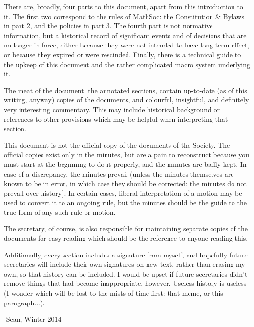 There are, broadly, four parts to this document, apart from this
introduction to it. The first two correspond to the rules of MathSoc:
the Constitution \& Bylaws in part 2, and the policies in part 3. The fourth
part is not normative information, but a historical record of significant events
and of decisions that are no longer in force, either because they were not
intended to have long-term effect, or because they expired or were rescinded.
Finally, there is a technical guide to the upkeep of this document and the
rather complicated macro system underlying it.

The meat of the document, the annotated sections, contain up-to-date (as of this
writing, anyway) copies of the documents, and colourful, insightful, and
definitely very interesting commentary. This may include historical background
or references to other provisions which may be helpful when interpreting that
section.

This document is not the official copy of the documents of the Society. The
official copies exist only in the minutes, but are a pain to reconstruct because
you must start at the beginning to do it properly, and the minutes are badly
kept. In case of a discrepancy, the minutes prevail (unless the minutes
themselves are known to be in error, in which case they should be corrected; the
minutes do not prevail over history). In certain cases, liberal interpretation
of a motion may be used to convert it to an ongoing rule, but the minutes should
be the guide to the true form of any such rule or motion.

The secretary, of course, is also responsible for maintaining separate copies of
the documents for easy reading which should be the reference to anyone reading
this.

Additionally, every section includes a signature from myself, and hopefully
future secretaries will include their own signatures on new text, rather than
erasing my own, so that history can be included. I would be upset if future
secretaries didn't remove things that had become inappropriate, however. Useless
history is useless (I wonder which will be lost to the mists of time first: that
meme, or this paragraph...).

-Sean, Winter 2014
